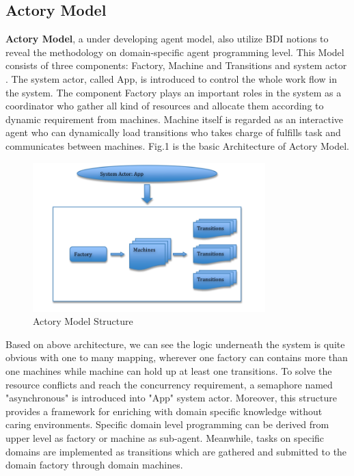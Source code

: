 \documentclass{sig-alternate}
\begin{document}
\subsection{Actory Model}
 \textbf{ Actory Model}, a under developing agent model, also utilize BDI notions to reveal the methodology on domain-specific agent programming level.  This Model consists of three components: Factory, Machine and Transitions and system actor \cite{Levesque94golog:a}. 
 The system actor, called App, is introduced to control the whole work flow in the system. The component Factory plays an important roles in the system as a coordinator who gather all kind of resources and allocate them according to dynamic requirement from machines. Machine itself is regarded as an interactive agent who can dynamically load transitions who takes charge of fulfills task and communicates between machines.  Fig.1 is the basic Architecture of Actory Model. \\

\begin{figure}[h]
\centering
\includegraphics[width=90mm ]{actorymodel}
\caption{Actory Model Structure}
\end{figure}

Based on above architecture, we can see the logic underneath the system is quite obvious with one to many mapping, wherever one factory can contains more than one machines while machine can hold up at least one transitions.  To solve the resource conflicts and reach the concurrency requirement, a semaphore named "asynchronous" is introduced into "App" system actor.  Moreover, this structure provides a framework for enriching with domain specific knowledge without caring environments. Specific domain level programming can be derived from upper level as factory or machine as sub-agent. Meanwhile, tasks on specific domains are implemented as transitions which are gathered and submitted to the domain factory through domain machines. 
\end{document}
